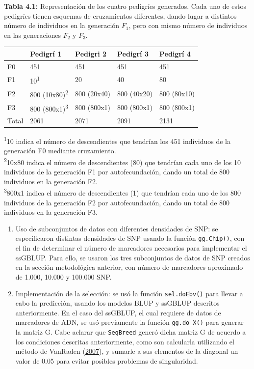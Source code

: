 \documentclass[11pt,spanish,a4paper,oneside,]{book} %
\begin{document}
\noindent
\textbf{Tabla 4.1:} Representación de los cuatro pedigríes generados. Cada uno de estos pedigríes tienen esquemas de cruzamientos diferentes, dando lugar a distintos número de individuos en la generación \(F_{1}\), pero con mismo número de individuos en las generaciones \(F_{2}\) y \(F_{3}\).

\captionsetup[table]{labelformat=empty,skip=1pt}
\begin{longtable}{lllll}
\toprule
  & Pedigrí 1 & Pedigri 2 & Pedigrí 3 & Pedigrí 4 \\ 
\midrule
F0 & 451 & 451 & 451 & 451 \\ 
F1 & 10\textsuperscript{1} & 20 & 40 & 80 \\ 
F2 & 800 (10x80)\textsuperscript{2} & 800 (20x40) & 800 (40x20) & 800 (80x10) \\ 
F3 & 800 (800x1)\textsuperscript{3} & 800 (800x1) & 800 (800x1) & 800 (800x1) \\ 
Total & 2061 & 2071 & 2091 & 2131 \\ 
 \bottomrule
\end{longtable}
\vspace{-5mm}
\begin{minipage}{\linewidth}
\textsuperscript{1}10 indica el número de descendientes que tendrían los 451 individuos de la generación F0 mediante cruzamiento. \\ 
\textsuperscript{2}10x80 indica el número de descendientes (80) que tendrían cada uno de los 10 individuos de la generación F1 por autofecundación, dando un total de 800 individuos en la generación F2. \\ 
\textsuperscript{3}800x1 indica el número de descendientes (1) que tendrían cada uno de los 800 individuos de la generación F2 por autofecundación, dando un total de 800 individuos en la generación F3. \\ 
\end{minipage}

\begin{enumerate}
\def\labelenumi{\arabic{enumi}.}
\setcounter{enumi}{3}
\item
  Uso de subconjuntos de datos con diferentes densidades de SNP: se especificaron distintas densidades de SNP usando la función \texttt{gg.Chip()}, con el fin de determinar el número de marcadores necesarios para implementar el ssGBLUP. Para ello, se usaron los tres subconjuntos de datos de SNP creados en la sección metodológica anterior, con número de marcadores aproximado de 1.000, 10.000 y 100.000 SNP.
\item
  Implementación de la selección: se usó la función \texttt{sel.doEbv()} para llevar a cabo la predicción, usando los modelos BLUP y ssGBLUP descritos anteriormente. En el caso del ssGBLUP, el cual requiere de datos de marcadores de ADN, se usó previamente la función \texttt{gg.do\_X()} para generar la matriz G. Cabe aclarar que \texttt{SeqBreed} generó dicha matriz G de acuerdo a los condiciones descritas anteriormente, como son calcularla utilizando el método de VanRaden (\protect\hyperlink{ref-cite:39}{2007}), y sumarle a sus elementos de la diagonal un valor de 0.05 para evitar posibles problemas de singularidad.
\end{enumerate}
\end{document}
